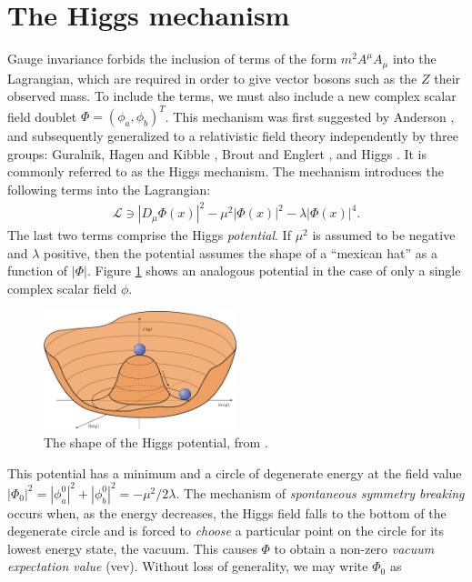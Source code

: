 \documentclass[twoside,english]{uiofysmaster}
\begin{document}
\section{The Higgs mechanism}
Gauge invariance forbids the inclusion of terms of the form $m^2A^\mu A_\mu$ into the Lagrangian, which are required in order to give vector bosons such as the $Z$ their observed mass. To include the terms, we must also include a new complex scalar field doublet $\Phi = (\phi_a, \phi_b)^T$. This mechanism was first suggested by Anderson \cite{1963PhRv..130..439A}, and subsequently generalized to a relativistic field theory independently by three groups: Guralnik, Hagen and Kibble \cite{1964PhRvL..13..585G}, Brout and Englert \cite{1964PhRvL..13..321E}, and Higgs \cite{Higgs:1964pj}. It is commonly referred to as the Higgs mechanism. The mechanism introduces the following terms into the Lagrangian:
\begin{align}
	\mathcal L \ni |D_\mu \Phi(x)|^2 - \mu^2|\Phi(x)|^2 - \lambda |\Phi(x)|^4.\label{eq:higgs_lagrange}
\end{align}
The last two terms comprise the Higgs {\it potential}. If $\mu^2$ is assumed to be negative and $\lambda$ positive, then the potential assumes the shape of a ``mexican hat'' as a function of $|\Phi|$. Figure  \ref{fig:higgspot} shows an analogous potential in the case of only a single complex scalar field $\phi$.
\begin{figure}[hbt]
	\centering
	\includegraphics[width=0.5\textwidth]{figures/susyintro/higgspot_nature.jpg}
	\caption{The shape of the Higgs potential, from \cite{Ellis:higgs}.}
	\label{fig:higgspot}
\end{figure}
This potential has a minimum and a circle of degenerate energy at the field value $|\Phi_0|^2 = |\phi_a^0|^2 + |\phi_b^0|^2 = -\mu^2/2\lambda$. The mechanism of {\it spontaneous symmetry breaking} occurs when, as the energy decreases, the Higgs field falls to the bottom of the degenerate circle and is forced to {\it choose} a particular point on the circle for its lowest energy state, the vacuum. This causes $\Phi$ to obtain a non-zero {\it vacuum expectation value} (vev). Without loss of generality, we may write $\Phi_0$ as
\end{document}

